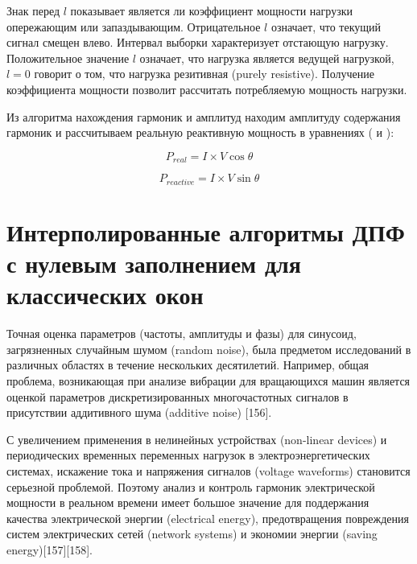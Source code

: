 Знак перед $l$ показывает является ли коэффициент мощности нагрузки опережающим или запаздывающим. Отрицательное $l$ означает, что текущий сигнал смещен влево. Интервал выборки характеризует отстающую нагрузку. Положительное значение $l$ означает, что нагрузка является ведущей нагрузкой, $l=0$ говорит о том, что нагрузка резитивная (purely resistive). Получение коэффициента мощности позволит рассчитать потребляемую мощность нагрузки.

Из алгоритма нахождения гармоник и амплитуд находим амплитуду содержания гармоник и рассчитываем реальную реактивную мощность в уравнениях ( и ):

\begin{equation}
\label{eq:equation10}
P_{real} = I\times V \cos \theta
\end{equation}

\begin{equation}
\label{eq:equation11}
P_{reactive} = I\times V \sin \theta
\end{equation}

\section{Интерполированные алгоритмы ДПФ с нулевым заполнением для классических окон} \label{sec:ch2/sec5}

Точная оценка параметров (частоты, амплитуды и фазы) для синусоид, загрязненных случайным шумом (random noise), была предметом исследований в различных областях в течение нескольких десятилетий. Например, общая проблема, возникающая при анализе вибрации для вращающихся машин является оценкой параметров дискретизированных многочастотных сигналов в присутствии аддитивного шума (additive noise) [156].


С увеличением применения в нелинейных устройствах (non-linear devices) и периодических временных переменных нагрузок в электроэнергетических системах, искажение тока и напряжения сигналов (voltage waveforms) становится серьезной проблемой. Поэтому анализ и контроль гармоник электрической мощности в реальном времени имеет большое значение для поддержания качества электрической энергии (electrical energy), предотвращения повреждения систем электрических сетей (network systems) и экономии энергии (saving energy)[157][158].

